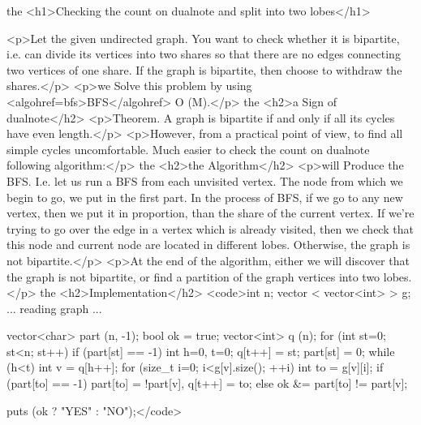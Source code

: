 the <h1>Checking the count on dualnote and split into two lobes</h1>

<p>Let the given undirected graph. You want to check whether it is bipartite, i.e. can divide its vertices into two shares so that there are no edges connecting two vertices of one share. If the graph is bipartite, then choose to withdraw the shares.</p>
<p>we Solve this problem by using <algohref=bfs>BFS</algohref> O (M).</p>
the <h2>a Sign of dualnote</h2>
<p>Theorem. A graph is bipartite if and only if all its cycles have even length.</p>
<p>However, from a practical point of view, to find all simple cycles uncomfortable. Much easier to check the count on dualnote following algorithm:</p>
the <h2>the Algorithm</h2>
<p>will Produce the BFS. I.e. let us run a BFS from each unvisited vertex. The node from which we begin to go, we put in the first part. In the process of BFS, if we go to any new vertex, then we put it in proportion, than the share of the current vertex. If we're trying to go over the edge in a vertex which is already visited, then we check that this node and current node are located in different lobes. Otherwise, the graph is not bipartite.</p>
<p>At the end of the algorithm, either we will discover that the graph is not bipartite, or find a partition of the graph vertices into two lobes.</p>
the <h2>Implementation</h2>
<code>int n;
vector < vector<int> > g;
... reading graph ...

vector<char> part (n, -1);
bool ok = true;
vector<int> q (n);
for (int st=0; st<n; st++)
if (part[st] == -1) {
int h=0, t=0;
q[t++] = st;
part[st] = 0;
while (h<t) {
int v = q[h++];
for (size_t i=0; i<g[v].size(); ++i) {
int to = g[v][i];
if (part[to] == -1)
part[to] = !part[v], q[t++] = to;
else
ok &= part[to] != part[v];
}
}
}

puts (ok ? "YES" : "NO");</code>
